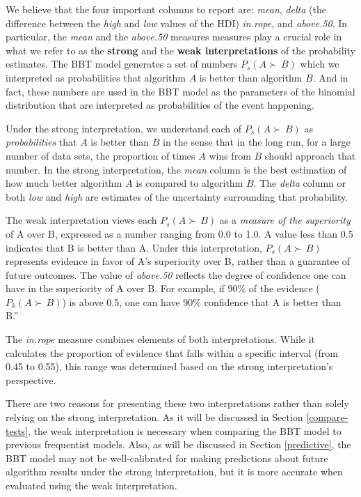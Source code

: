 \documentclass[twoside,11pt,preprint]{article}
\begin{document}
We believe that the four important columns to report are: {\em mean},
{\em delta} (the difference between the {\em high} and {\em low} values of the HDI)
{\em in.rope}, and {\em above.50}. In particular, the {\em mean} and the {\em above.50}
measures measures play a crucial role in what we refer to as the \textbf{strong} and the
\textbf{weak interpretations} of the probability estimates. The
BBT model generates a set of numbers \(P_s(A \succ\,B)\) which we interpreted as probabilities that algorithm \(A\) is better than algorithm \(B\). And in fact,
these numbers are used in the BBT model as the parameters of the
binomial distribution that are interpreted as probabilities of the
event happening.

Under the strong interpretation, we understand each of \(P_s(A \succ\,B)\)
as \emph{probabilities} that \(A\) is better than \(B\) in the sense that
in the long run, for a large number of data
sets, the proportion of times \(A\) wins from \(B\) should approach that
number. In the strong interpretation, the {\em mean} column is the best estimation of how much better algorithm \(A\) is compared to algorithm \(B\). The {\em delta} column or both
{\em low} and {\em high} are estimates of the uncertainty surrounding that probability.

The weak interpretation views each \(P_s(A \succ\,B)\) as a \emph{measure of the superiority} of A over B, expressed as a number ranging from 0.0 to 1.0. A value less than 0.5 indicates that B is better than A. Under this interpretation, \(P_s(A \succ\,B)\) represents evidence in favor of A's superiority over B, rather than a guarantee of future outcomes. The value of {\em above.50} reflects the degree of confidence one can have in the superiority of A over B. For example, if 90\% of the evidence (\(P_k(A \succ\,B)\)) is above 0.5, one can have 90\% confidence that A is better than B.''

The {\em in.rope} measure combines elements of both interpretations. While it calculates the proportion of evidence that falls within a specific interval (from 0.45 to 0.55), this range was determined based on the strong interpretation's perspective.

There are two reasons for presenting these two interpretations rather than solely relying on the strong interpretation. As it will be discussed in Section \ref{compare-tests}, the weak interpretation is necessary when comparing the BBT model to previous frequentist models. Also, as will be discussed in Section \ref{predictive}, the BBT model may not be well-calibrated for making predictions about future algorithm results under the strong interpretation, but it is more accurate when evaluated using the weak interpretation.
\end{document}
